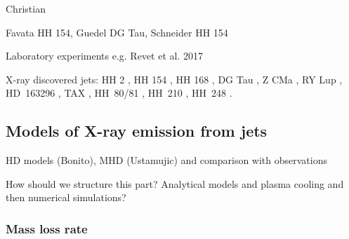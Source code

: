 {\color{blue}Christian

Favata HH 154, Guedel DG Tau, Schneider HH 154

Laboratory experiments  e.g. Revet et al. 2017
}

X-ray discovered jets: HH 2 \citep{Pravdo_2001,Schneider_2012}, HH 154 \citep{Favata_2002,Bally_2003,Favata_2006,Schneider_2011}, HH 168 \citep{Pravdo_2005,Schneider_2009}, DG Tau \citep{Guedel_2005,Guedel_2008,Schneider_2008}, Z CMa \citep{Stelzer_2009}, RY Lup \citep{Skinner_2011}, HD~163296 \citep{Swartz_2005,Guenther_2013}, TAX \citep{Guedel_2007}, HH~80/81 \citep{Pravdo_2004}, HH~210 \citep{Grosso_2006}, HH~248 \citep{Lopez_2015}.

\subsection{Models of X-ray emission from jets}

\citet{Raga_2002}

HD models (Bonito), MHD (Ustamujic) and comparison with observations

How should we structure this part? Analytical models and plasma cooling and then numerical simulations?

\subsubsection{Mass loss rate}

